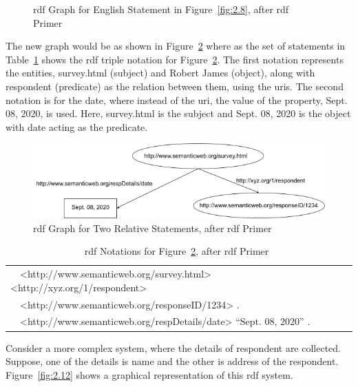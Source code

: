 \begin{doublespace}
\begin{figure}[htp]
    \caption{\ac{rdf} Graph for English Statement in Figure~\ref{fig:2.8}, after \ac{rdf} Primer~\cite{manola2004rdf}}
    \label{fig:2.10}
\end{figure}
\par The new graph would be as shown in Figure~\ref{fig:2.11} where as the set of statements in Table~\ref{table:2.2} shows the \ac{rdf} triple notation for Figure~\ref{fig:2.11}. The first notation represents the entities, survey.html (subject) and Robert James (object), along with respondent (predicate) as the relation between them, using the \ac{uri}s. The second notation is for the date, where instead of the \ac{uri}, the value of the property, Sept. 08, 2020, is used. Here, survey.html is the subject and Sept. 08, 2020 is the object with date acting as the predicate.
\begin{figure}[htp]
    \centering
    \includegraphics[width=15cm]{images/ch2/Figure11.png}
    \caption{\ac{rdf} Graph for Two Relative Statements, after \ac{rdf} Primer~\cite{manola2004rdf}}
    \label{fig:2.11}
\end{figure}
\begin{table}[h!]
\centering
\begin{tabular}{|l|} 
 \hline
  \ \ <http://www.semanticweb.org/survey.html> <http://xyz.org/1/respondent> \\ \ \ <http://www.semanticweb.org/responseID/1234> . \\ \hline
 \ \ <http://www.semanticweb.org/respDetails/date> “Sept. 08, 2020” . \\ \hline
\end{tabular}
\caption{\ac{rdf} Notations for Figure~\ref{fig:2.11}, after \ac{rdf} Primer~\cite{manola2004rdf}}
\label{table:2.2}
\end{table}
\par Consider a more complex system, where the details of respondent are collected. Suppose, one of the details is name and the other is address of the respondent.  Figure~\ref{fig:2.12} shows a graphical representation of this \ac{rdf} system.
\begin{figure}[htp]
    \centering

\end{figure}
\end{doublespace}
